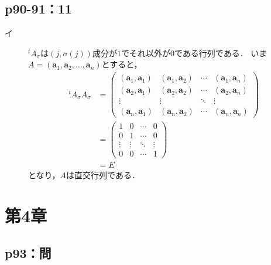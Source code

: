 \documentclass[uplatex,dvipdfmx,a4paper,10pt,fleqn]{jsarticle}
\begin{document}
\subsection*{p90-91：11}
\begin{tleftbar}
    \begin{description}
        \item[イ] ${}^t A_\sigma$は$(j,\sigma(j))$成分が$1$でそれ以外が$0$である行列である．
        いま$A = (\bm{a}_1,\bm{a}_2,\ldots,\bm{a}_n)$とすると，
        \begin{align*}
            {}^t A_\sigma A_\sigma &= 
            \begin{pmatrix} 
                (\bm{a}_1,\bm{a}_1) & (\bm{a}_1,\bm{a}_2) & \cdots & (\bm{a}_1,\bm{a}_n) \\ 
                (\bm{a}_2,\bm{a}_1) & (\bm{a}_2,\bm{a}_2) & \cdots & (\bm{a}_2,\bm{a}_n) \\
                \vdots & \vdots & \ddots & \vdots \\
                (\bm{a}_n,\bm{a}_1) & (\bm{a}_n,\bm{a}_2) & \cdots & (\bm{a}_n,\bm{a}_n)
            \end{pmatrix}
            \\
            & = \begin{pmatrix} 1 & 0 & \cdots & 0 \\ 0 & 1 & \cdots & 0 \\ \vdots & \vdots & \ddots & \vdots \\ 0 & 0 & \cdots & 1 \end{pmatrix} \\
            &= E
        \end{align*}
        となり，$A$は直交行列である．
    \end{description}
\end{tleftbar}

\newpage 


\section*{第4章}



\subsection*{p93：問}
\end{document}
